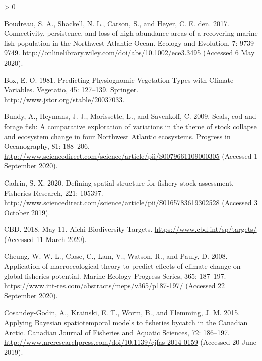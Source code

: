 \documentclass[
]{article}
\newlength{\cslhangindent}
\newenvironment{CSLReferences}[2] %
 {%
  \setlength{\parindent}{0pt}
  \ifodd #1 \everypar{\setlength{\hangindent}{\cslhangindent}}\ignorespaces\fi
  \ifnum #2 > 0
  \setlength{\parskip}{#2\baselineskip}
  \fi
 }%
 {}
\begin{document}
\begin{CSLReferences}{1}{0}
\leavevmode\hypertarget{ref-boudreauConnectivityPersistenceLoss2017}{}%
Boudreau, S. A., Shackell, N. L., Carson, S., and Heyer, C. E. den. 2017. Connectivity, persistence, and loss of high abundance areas of a recovering marine fish population in the {Northwest Atlantic Ocean}. Ecology and Evolution, 7: 9739--9749. \url{http://onlinelibrary.wiley.com/doi/abs/10.1002/ece3.3495} (Accessed 6 May 2020).

\leavevmode\hypertarget{ref-boxPredictingPhysiognomicVegetation1981}{}%
Box, E. O. 1981. Predicting {Physiognomic Vegetation Types} with {Climate Variables}. Vegetatio, 45: 127--139. {Springer}. \url{http://www.jstor.org/stable/20037033}.

\leavevmode\hypertarget{ref-bundySealsCodForage2009}{}%
Bundy, A., Heymans, J. J., Morissette, L., and Savenkoff, C. 2009. Seals, cod and forage fish: {A} comparative exploration of variations in the theme of stock collapse and ecosystem change in four {Northwest Atlantic} ecosystems. Progress in Oceanography, 81: 188--206. \url{http://www.sciencedirect.com/science/article/pii/S0079661109000305} (Accessed 1 September 2020).

\leavevmode\hypertarget{ref-cadrinDefiningSpatialStructure2020a}{}%
Cadrin, S. X. 2020. Defining spatial structure for fishery stock assessment. Fisheries Research, 221: 105397. \url{http://www.sciencedirect.com/science/article/pii/S0165783619302528} (Accessed 3 October 2019).

\leavevmode\hypertarget{ref-cbdAichiBiodiversityTargets2018}{}%
CBD. 2018, May 11. Aichi {Biodiversity Targets}. \url{https://www.cbd.int/sp/targets/} (Accessed 11 March 2020).

\leavevmode\hypertarget{ref-cheungApplicationMacroecologicalTheory2008}{}%
Cheung, W. W. L., Close, C., Lam, V., Watson, R., and Pauly, D. 2008. Application of macroecological theory to predict effects of climate change on global fisheries potential. Marine Ecology Progress Series, 365: 187--197. \url{https://www.int-res.com/abstracts/meps/v365/p187-197/} (Accessed 22 September 2020).

\leavevmode\hypertarget{ref-cosandey-godinApplyingBayesianSpatiotemporal2015}{}%
Cosandey-Godin, A., Krainski, E. T., Worm, B., and Flemming, J. M. 2015. Applying {Bayesian} spatiotemporal models to fisheries bycatch in the {Canadian Arctic}. Canadian Journal of Fisheries and Aquatic Sciences, 72: 186--197. \url{http://www.nrcresearchpress.com/doi/10.1139/cjfas-2014-0159} (Accessed 20 June 2019).


\end{CSLReferences}
\end{document}
